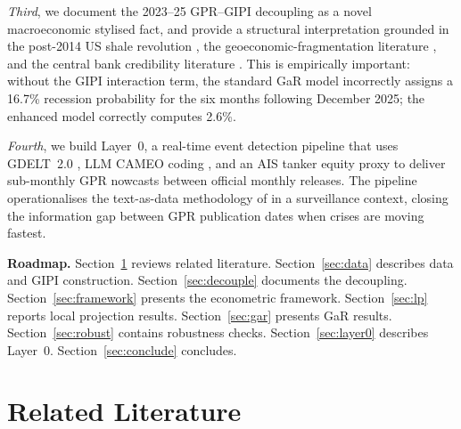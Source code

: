 \documentclass[12pt]{article}
\begin{document}
\textit{Third}, we document the 2023--25 GPR--GIPI decoupling as
a novel macroeconomic stylised fact, and provide a structural
interpretation grounded in the post-2014 US shale revolution
\citep{baumeister2019}, the geoeconomic-fragmentation literature
\citep{aiyar2023,fernandez2024}, and the central bank credibility
literature \citep{caldara2025}.
This is empirically important: without the GIPI interaction term,
the standard GaR model incorrectly assigns a 16.7\% recession
probability for the six months following December 2025; the enhanced
model correctly computes 2.6\%.

\textit{Fourth}, we build Layer~0, a real-time event detection pipeline
that uses GDELT~2.0 \citep{leetaru2013}, LLM CAMEO coding
\citep{schrodt2009,hassan2019}, and an AIS tanker equity proxy to
deliver sub-monthly GPR nowcasts between official monthly releases.
The pipeline operationalises the text-as-data methodology of
\citet{baker2016} in a surveillance context, closing the information
gap between GPR publication dates when crises are moving fastest.

\medskip
\noindent\textbf{Roadmap.}
Section~\ref{sec:lit} reviews related literature.
Section~\ref{sec:data} describes data and GIPI construction.
Section~\ref{sec:decouple} documents the decoupling.
Section~\ref{sec:framework} presents the econometric framework.
Section~\ref{sec:lp} reports local projection results.
Section~\ref{sec:gar} presents GaR results.
Section~\ref{sec:robust} contains robustness checks.
Section~\ref{sec:layer0} describes Layer~0.
Section~\ref{sec:conclude} concludes.


\section{Related Literature}\label{sec:lit}
\end{document}
